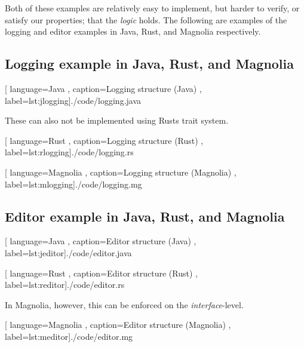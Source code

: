 Both of these examples are relatively easy to implement, but harder to verify,
or satisfy our properties; that the \textit{logic} holds. The following are
examples of the logging and editor examples in Java, Rust, and Magnolia
respectively.

\subsection{Logging example in Java, Rust, and Magnolia}


\begin{center}
  
    [ language=Java
    , caption={Logging structure (Java)}
    , label=lst:jlogging]{./code/logging.java}
\end{center}

These can also not be implemented using Rusts trait system.

\begin{center}
  
    [ language=Rust
    , caption={Logging structure (Rust)}
    , label=lst:rlogging]{./code/logging.rs}
\end{center}

\begin{center}
  
    [ language=Magnolia
    , caption={Logging structure (Magnolia)}
    , label=lst:mlogging]{./code/logging.mg}
\end{center}

\subsection{Editor example in Java, Rust, and Magnolia}


\begin{center}
  
    [ language=Java
    , caption={Editor structure (Java)}
    , label=lst:jeditor]{./code/editor.java}
\end{center}

\begin{center}
  
    [ language=Rust
    , caption={Editor structure (Rust)}
    , label=lst:reditor]{./code/editor.rs}
\end{center}

In Magnolia, however, this can be enforced on the \textit{interface}-level.

\begin{center}
  
    [ language=Magnolia
    , caption={Editor structure (Magnolia)}
    , label=lst:meditor]{./code/editor.mg}
\end{center}

